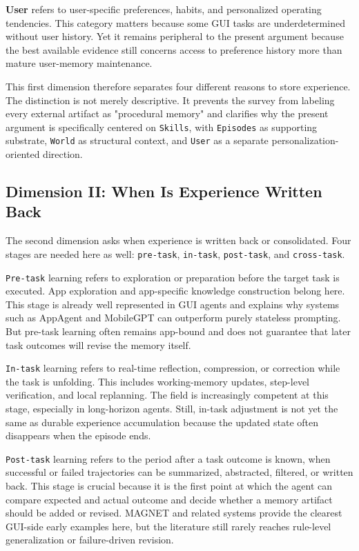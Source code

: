 \documentclass{article}
\begin{document}
\textbf{User} refers to user-specific preferences, habits, and
personalized operating tendencies. This category matters because some
GUI tasks are underdetermined without user history. Yet it remains
peripheral to the present argument because the best available evidence
still concerns access to preference history more than mature user-memory
maintenance.

This first dimension therefore separates four different reasons to store
experience. The distinction is not merely descriptive. It prevents the
survey from labeling every external artifact as "procedural memory" and
clarifies why the present argument is specifically centered on
\texttt{Skills}, with \texttt{Episodes} as supporting substrate,
\texttt{World} as structural context, and \texttt{User} as a separate
personalization-oriented direction.

\subsection{Dimension II: When Is Experience Written
Back}\label{42-dimension-ii-when-is-experience-written-back}

The second dimension asks when experience is written back or
consolidated. Four stages are needed here as well: \texttt{pre-task},
\texttt{in-task}, \texttt{post-task}, and \texttt{cross-task}.

\texttt{Pre-task} learning refers to exploration or preparation before
the target task is executed. App exploration and app-specific knowledge
construction belong here. This stage is already well represented in GUI
agents and explains why systems such as AppAgent and MobileGPT can
outperform purely stateless prompting. But pre-task learning often
remains app-bound and does not guarantee that later task outcomes will
revise the memory itself.

\texttt{In-task} learning refers to real-time reflection, compression,
or correction while the task is unfolding. This includes working-memory
updates, step-level verification, and local replanning. The field is
increasingly competent at this stage, especially in long-horizon agents.
Still, in-task adjustment is not yet the same as durable experience
accumulation because the updated state often disappears when the episode
ends.

\texttt{Post-task} learning refers to the period after a task outcome is
known, when successful or failed trajectories can be summarized,
abstracted, filtered, or written back. This stage is crucial because it
is the first point at which the agent can compare expected and actual
outcome and decide whether a memory artifact should be added or revised.
MAGNET and related systems provide the clearest GUI-side early examples
here, but the literature still rarely reaches rule-level generalization
or failure-driven revision.
\end{document}
